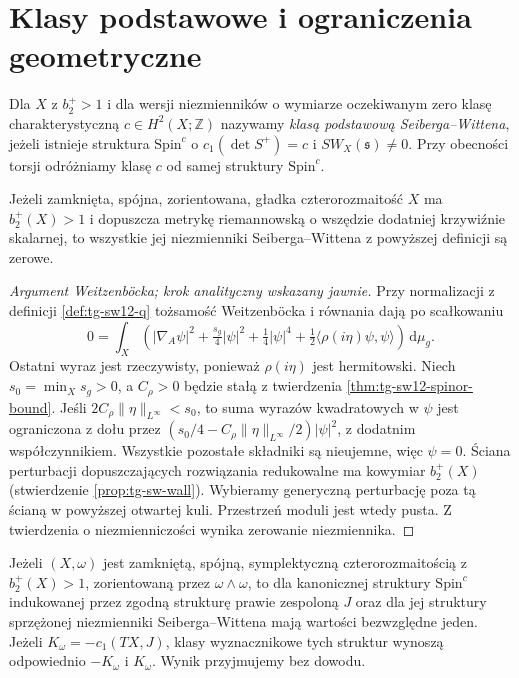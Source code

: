\section{Klasy podstawowe i ograniczenia geometryczne}
\label{sec:tg-sw-basic}

\begin{definicja}
Dla $X$ z $b_2^+>1$ i dla wersji
niezmienników o wymiarze oczekiwanym zero klasę
charakterystyczną $c\in H^2(X;\mathbb Z)$
nazywamy \emph{klasą podstawową Seiberga--Wittena},
jeżeli istnieje struktura $\mathrm{Spin}^c$ o
$c_1(\det S^+)=c$ i $SW_X(\mathfrak s)\ne0$.
Przy obecności torsji odróżniamy klasę $c$ od samej
struktury $\mathrm{Spin}^c$.
\end{definicja}

\begin{twierdzenie}
\label{thm:tg-sw-psc}
Jeżeli zamknięta, spójna, zorientowana,
gładka czterorozmaitość $X$ ma $b_2^+(X)>1$
i dopuszcza metrykę riemannowską o wszędzie dodatniej
krzywiźnie skalarnej, to wszystkie jej niezmienniki
Seiberga--Wittena z powyższej definicji są zerowe.
\end{twierdzenie}

\begin{proof}[Argument Weitzenböcka; krok analityczny wskazany jawnie]
Przy normalizacji z definicji \ref{def:tg-sw12-q}
tożsamość Weitzenböcka i równania dają po
scałkowaniu
\[
0=\int_X\left(
|\nabla_A\psi|^2+\tfrac{s_g}{4}|\psi|^2
+\tfrac14|\psi|^4+
\tfrac12\langle\rho(i\eta)\psi,\psi\rangle
\right)\,\mathrm d\mu_g.
\]
Ostatni wyraz jest rzeczywisty, ponieważ
$\rho(i\eta)$ jest hermitowski. Niech
$s_0=\min_X s_g>0$, a $C_\rho>0$ będzie
stałą z twierdzenia \ref{thm:tg-sw12-spinor-bound}.
Jeśli $2C_\rho\|\eta\|_{L^\infty}<s_0$, to
suma wyrazów kwadratowych w $\psi$ jest
ograniczona z dołu przez
$(s_0/4-C_\rho\|\eta\|_{L^\infty}/2)|\psi|^2$,
z dodatnim współczynnikiem. Wszystkie pozostałe
składniki są nieujemne, więc $\psi=0$.
Ściana perturbacji dopuszczających rozwiązania
redukowalne ma kowymiar $b_2^+(X)$
(stwierdzenie \ref{prop:tg-sw-wall}).
Wybieramy generyczną perturbację poza tą
ścianą w powyższej otwartej kuli.
Przestrzeń moduli jest wtedy pusta. Z twierdzenia
o niezmienniczości wynika zerowanie niezmiennika.
\end{proof}

\begin{twierdzenie}
\label{thm:tg-sw-taubes}
Jeżeli $(X,\omega)$ jest zamkniętą, spójną,
symplektyczną czterorozmaitością z $b_2^+(X)>1$,
zorientowaną przez $\omega\wedge\omega$, to dla
kanonicznej struktury $\mathrm{Spin}^c$ indukowanej
przez zgodną strukturę prawie zespoloną $J$
oraz dla jej struktury sprzężonej niezmienniki
Seiberga--Wittena mają wartości bezwzględne jeden.
Jeżeli $K_\omega=-c_1(TX,J)$, klasy wyznacznikowe
tych struktur wynoszą odpowiednio $-K_\omega$
i $K_\omega$. Wynik przyjmujemy bez dowodu.
\end{twierdzenie}

